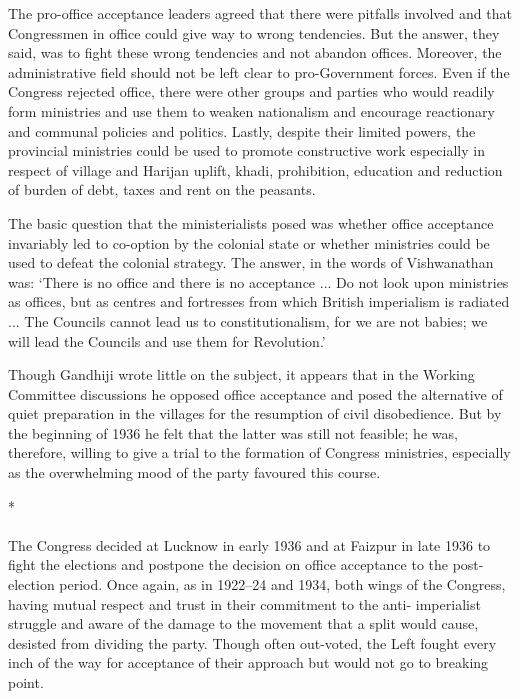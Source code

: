 \begin{multicols}{2}
The pro-office acceptance leaders agreed that there were pitfalls involved and that Congressmen in office could give way to wrong tendencies. But the answer, they said, was to fight these wrong tendencies and not abandon offices. Moreover, the administrative field should not be left clear to pro-Government forces. Even if the Congress rejected office, there were other groups and parties who would readily form ministries and use them to weaken nationalism and encourage reactionary and communal policies and politics. Lastly, despite their limited powers, the provincial ministries could be used to promote constructive work especially in respect of village and Harijan uplift, khadi, prohibition, education and reduction of burden of debt, taxes and rent on the peasants. 

The basic question that the ministerialists posed was whether office acceptance invariably led to co-option by the colonial state or whether ministries could be used to defeat the colonial strategy. The answer, in the words of Vishwanathan was: `There is no office and there is no acceptance ... Do not look upon ministries as offices, but as centres and fortresses from which British imperialism is radiated ... The Councils cannot lead us to constitutionalism, for we are not babies; we will lead the Councils and use them for Revolution.' 

Though Gandhiji wrote little on the subject, it appears that in the Working Committee discussions he opposed office acceptance and posed the alternative of quiet preparation in the villages for the resumption of civil disobedience. But by the beginning of 1936 he felt that the latter was still not feasible; he was, therefore, willing to give a trial to the formation of Congress ministries, especially as the overwhelming mood of the party favoured this course.

\begin{center}*\end{center}

\paragraph*{}

The Congress decided at Lucknow in early 1936 and at Faizpur in late 1936 to fight the elections and postpone the decision on office acceptance to the post-election period. Once again, as in 1922--24 and 1934, both wings of the Congress, having mutual respect and trust in their commitment to the anti- imperialist struggle and aware of the damage to the movement that a split would cause, desisted from dividing the party. Though often out-voted, the Left fought every inch of the way for acceptance of their approach but would not go to breaking point. 


\end{multicols}
